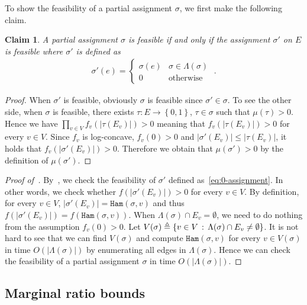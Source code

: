\documentclass[11pt]{article}
\newtheorem{claim}[theorem]{Claim}
\newcommand{\abs}[1]{\left\vert#1\right\vert}
\newcommand{\set}[1]{\left\{#1\right\}}
\newcommand{\defeq}{\triangleq} \renewcommand{\d}{\,\-d}
\def\!#1{\mathtt{#1}}
\newcommand{\Ham}{\!{Ham}}
\begin{document}
To show the feasibility of a partial assignment $\sigma$, we first make the following claim.
\begin{claim} \label{claim:partial-assignment-feasibility}
    A partial assignment $\sigma$ is feasible if and only if the assignment $\sigma'$ on $E$ is feasible where $\sigma'$ is defined as
    \begin{align} \label{eq:0-assignment}
        \sigma'(e) = \begin{cases}
            \sigma(e) & \sigma \in \Lambda(\sigma) \\
            0 & \mbox{otherwise}
        \end{cases}\;.
    \end{align}
\end{claim}
\begin{proof}
    When $\sigma'$ is feasible, obviously $\sigma$ is feasible since $\sigma' \in \sigma$. To see the other side, when $\sigma$ is feasible, there exists $\tau : E \to \set{0, 1}$, $\tau \in \sigma$ such that $\mu(\tau) > 0$. Hence we have $\prod_{v \in V} f_v\left(\abs{\tau(E_v)}\right) > 0$ meaning that $f_v\left(\abs{\tau(E_v)}\right) > 0$ for every $v \in V$. Since $f_v$ is log-concave, $f_v(0) > 0$ and $\abs{\sigma'(E_v)} \le \abs{\tau(E_v)}$, it holds that $f_v\left(\abs{\sigma'(E_v)}\right) > 0$. Therefore we obtain that $\mu(\sigma') > 0$ by the definition of $\mu(\sigma')$.
\end{proof}

\begin{proof}[Proof of~]
    By~, we check the feasibility of $\sigma'$ defined as~\eqref{eq:0-assignment}. In other words, we check whether $f\left(\abs{\sigma'(E_v)}\right) > 0$ for every $v \in V$. By definition, for every $v \in V$, $\abs{\sigma'(E_v)} = \Ham(\sigma, v)$ and thus $f\left(\abs{\sigma'(E_v)}\right) = f\left(\Ham(\sigma, v)\right)$. When $\Lambda(\sigma) \cap E_v = \emptyset$, we need to do nothing from the assumption $f_v(0) > 0$. Let $V(\sigma) \defeq \set{v \in V \cmid \Lambda(\sigma) \cap E_v \neq \emptyset}$. It is not hard to see that we can find $V(\sigma)$ and compute $\Ham(\sigma, v)$ for every $v \in V(\sigma)$ in time $O(\abs{\Lambda(\sigma)})$ by enumerating all edges in $\Lambda(\sigma)$. Hence we can check the feasibility of a partial assignment $\sigma$ in time $O(\abs{\Lambda(\sigma)})$. 
\end{proof}

\subsection{Marginal ratio bounds}
\end{document}
